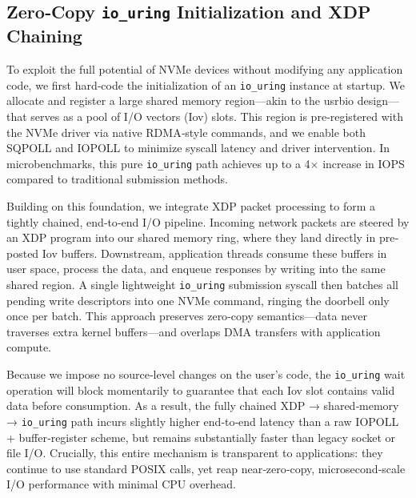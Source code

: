 \documentclass[sigconf,10pt]{acmart}
\begin{document}
\subsection{Zero‐Copy \texttt{io\_uring} Initialization and XDP Chaining}

To exploit the full potential of NVMe devices without modifying any application code, we first hard‐code the initialization of an \texttt{io\_uring} instance at startup. We allocate and register a large shared memory region—akin to the usrbio design—that serves as a pool of I/O vectors (Iov) slots. This region is pre‐registered with the NVMe driver via native RDMA‐style commands, and we enable both SQPOLL and IOPOLL to minimize syscall latency and driver intervention. In microbenchmarks, this pure \texttt{io\_uring} path achieves up to a 4× increase in IOPS compared to traditional submission methods.

Building on this foundation, we integrate XDP packet processing to form a tightly chained, end‐to‐end I/O pipeline. Incoming network packets are steered by an XDP program into our shared memory ring, where they land directly in pre‐posted Iov buffers. Downstream, application threads consume these buffers in user space, process the data, and enqueue responses by writing into the same shared region. A single lightweight \texttt{io\_uring} submission syscall then batches all pending write descriptors into one NVMe command, ringing the doorbell only once per batch. This approach preserves zero‐copy semantics—data never traverses extra kernel buffers—and overlaps DMA transfers with application compute.

Because we impose no source‐level changes on the user’s code, the \texttt{io\_uring} wait operation will block momentarily to guarantee that each Iov slot contains valid data before consumption. As a result, the fully chained XDP → shared‐memory → \texttt{io\_uring} path incurs slightly higher end‐to‐end latency than a raw IOPOLL + buffer‐register scheme, but remains substantially faster than legacy socket or file I/O. Crucially, this entire mechanism is transparent to applications: they continue to use standard POSIX calls, yet reap near‐zero‐copy, microsecond‐scale I/O performance with minimal CPU overhead.  
\end{document}
